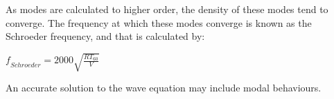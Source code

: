 As modes are calculated to higher order, the density of these modes tend to converge. The frequency at which these modes converge is known as the Schroeder frequency, and that is calculated by:\\
\begin{center}
$ \textit{f}_{Schroeder} = 2000 \sqrt{\frac{RT_{60}}{V}} $\\
\end{center}
An accurate solution to the wave equation may include modal behaviours.


